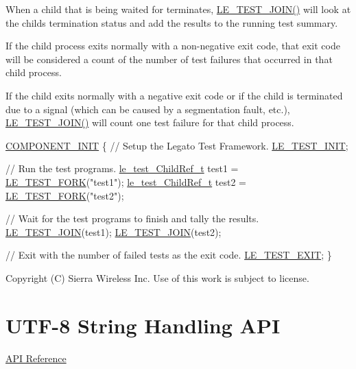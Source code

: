 When a child that is being waited for terminates, \hyperlink{le__test_8h_ad6045dfae96da7c326024c784de3d207}{L\+E\+\_\+\+T\+E\+S\+T\+\_\+\+J\+O\+I\+N()} will look at the child\textquotesingle{}s termination status and add the results to the running test summary.

If the child process exits normally with a non-\/negative exit code, that exit code will be considered a count of the number of test failures that occurred in that child process.

If the child exits normally with a negative exit code or if the child is terminated due to a signal (which can be caused by a segmentation fault, etc.), \hyperlink{le__test_8h_ad6045dfae96da7c326024c784de3d207}{L\+E\+\_\+\+T\+E\+S\+T\+\_\+\+J\+O\+I\+N()} will count one test failure for that child process.


\begin{DoxyCode}
\hyperlink{le__event_loop_8h_abdb9187a56836a93d19cc793cbd4b7ec}{COMPONENT\_INIT}
\{
    \textcolor{comment}{// Setup the Legato Test Framework.}
    \hyperlink{le__test_8h_a219d49d27a2a5a1a6dc63f31b0b66c23}{LE\_TEST\_INIT};

    \textcolor{comment}{// Run the test programs.}
    \hyperlink{le__test_8h_ab2de7b7c51414646bad2bc4ec2dda444}{le\_test\_ChildRef\_t} test1 = \hyperlink{le__test_8h_ac0c538ca3dfcd072464385b2f7e2776f}{LE\_TEST\_FORK}(\textcolor{stringliteral}{"test1"});
    \hyperlink{le__test_8h_ab2de7b7c51414646bad2bc4ec2dda444}{le\_test\_ChildRef\_t} test2 = \hyperlink{le__test_8h_ac0c538ca3dfcd072464385b2f7e2776f}{LE\_TEST\_FORK}(\textcolor{stringliteral}{"test2"});

    \textcolor{comment}{// Wait for the test programs to finish and tally the results.}
    \hyperlink{le__test_8h_ad6045dfae96da7c326024c784de3d207}{LE\_TEST\_JOIN}(test1);
    \hyperlink{le__test_8h_ad6045dfae96da7c326024c784de3d207}{LE\_TEST\_JOIN}(test2);

    \textcolor{comment}{// Exit with the number of failed tests as the exit code.}
    \hyperlink{le__test_8h_a5f0517641049c368d0a55658c4f4ddec}{LE\_TEST\_EXIT};
\}
\end{DoxyCode}






Copyright (C) Sierra Wireless Inc. Use of this work is subject to license. \hypertarget{c_utf8}{}\section{U\+T\+F-\/8 String Handling A\+P\+I}\label{c_utf8}
\hyperlink{le__utf8_8h}{A\+P\+I Reference}





